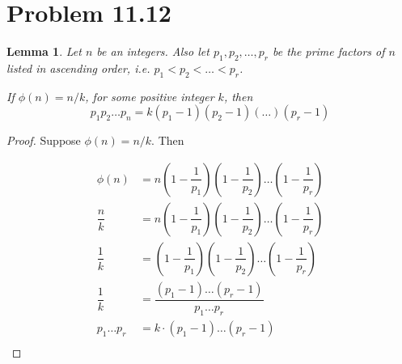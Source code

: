 \documentclass[letterpaper, 12pt, oneside]{memoir}
\theoremstyle{mystyle}
\newtheorem{lemma}[thm]{Lemma}
\begin{document}
\section{Problem 11.12} 

\begin{lemma}
    Let $n$ be an integers. Also let $p_1, p_2, \ldots, p_r$ be the prime
    factors of $n$ listed in ascending order, i.e. $p_1 < p_2 < \ldots < p_r$.
    
    If $\phi(n) = n/k$, for some positive integer $k$, then
    \[p_1 p_2 \ldots p_n = k(p_1 - 1)(p_2 - 1)(\ldots)(p_r - 1) \]
\end{lemma}
\begin{proof}
    Suppose $\phi(n) = n/k$. Then

    \begin{align*}
        \phi(n) &= n \left( 1 - \dfrac{1}{p_1} \right) \left( 1 - \dfrac{1}{p_2} \right) \dots \left( 1 - \dfrac{1}{p_r} \right) \\
        \dfrac{n}{k} &= n \left( 1 - \dfrac{1}{p_1} \right) \left( 1 - \dfrac{1}{p_2} \right) \dots \left( 1 - \dfrac{1}{p_r} \right) \\
        \dfrac{1}{k} &= \left( 1 - \dfrac{1}{p_1} \right) \left( 1 - \dfrac{1}{p_2} \right) \dots \left( 1 - \dfrac{1}{p_r} \right) \\
        \dfrac{1}{k} &= \dfrac{(p_1 - 1) \dots (p_r - 1)}{p_1 \dots p_r} \\
        p_1 \dots p_r &= k \cdot (p_1 - 1) \dots (p_r - 1) \\
    \end{align*}
    
\end{proof}
\end{document}
